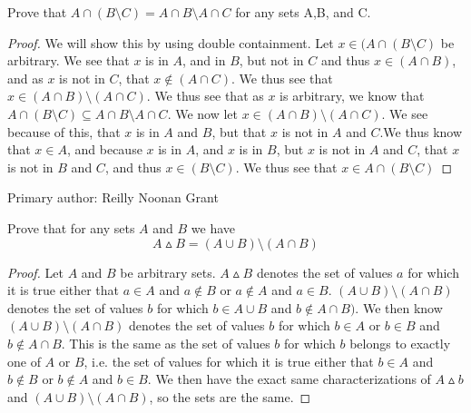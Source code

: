             \begin{minorEx}%
            Prove that $A\cap (B \setminus C) =A\cap B \setminus A\cap C$ for any sets A,B, and C.
             \end{minorEx}
   	\begin{proof}
            We will show this by using double containment. 
            Let $x\in (A \cap (B \setminus C )$ be arbitrary. 
            We see that $x$ is in $A$, and in $B$, but not in $C$ and thus $x \in (A \cap B)$, and as $x$ is not in $C$, that $x\notin (A\cap C)$. We thus see that $x \in (A \cap B) \setminus (A \cap C)$.
            We thus see that as $x$ is arbitrary, we know that $A\cap (B \setminus C) \subseteq A\cap B \setminus A\cap C$.
            We now let $x \in (A \cap B) \setminus (A \cap C)$. 
            We see because of this, that $x$ is in $A$ and $B$, but that $x$ is not in $A$ and $C$.We thus know that $x \in A$, and because $x$ is in $A$, and $x$ is in $B$, but $x$ is not in $A$ and $C$, that $x$ is not in $B$ and $C$, and thus $x\in (B\setminus C)$. We thus see that $x \in A \cap (B \setminus C)$
            
	\end{proof}
    Primary author: Reilly Noonan Grant
    \begin{minorEx}%
    Prove that for any sets $A$ and $B$ we have $$A \vartriangle B = (A \cup B) \setminus (A \cap B)$$
    \begin{proof}
    Let $A$ and $B$ be arbitrary sets. $A \vartriangle B$ denotes the set of values $a$ for which it is true either that $a \in A$ and $a \not \in B$ or $a \not \in A$ and $a \in B$. $(A \cup B) \setminus (A \cap B)$ denotes the set of values $b$ for which $b \in A \cup B$ and $b \not \in A \cap B)$. We then know $(A \cup B) \setminus (A \cap B)$ denotes the set of values $b$ for which $b \in A$ or $b \in B$ and $b \not \in A \cap B$. This is the same as the set of values $b$ for which $b$ belongs to exactly one of $A$ or $B$, i.e. the set of values for which it is true either that $b \in A$ and $b \not \in B$ or $b \not \in A$ and $b \in B$. We then have the exact same characterizations of $A \vartriangle b$ and $(A \cup B) \setminus (A \cap B)$, so the sets are the same.
    \end{proof}
    \end{minorEx}
    
